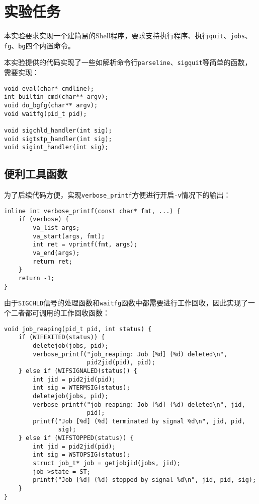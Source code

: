 \documentclass[a4paper, 11pt]{ctexart}
\let\oldsection\section
\renewcommand{\section}{\clearpage\oldsection}
\begin{document}
\section{实验任务}

本实验要求实现一个建简易的Shell程序，要求支持执行程序、执行\texttt{quit}、\texttt{jobs}、\texttt{fg}、\texttt{bg}四个内置命令。

本实验提供的代码实现了一些如解析命令行\texttt{parseline}、\texttt{sigquit}等简单的函数，需要实现：

\begin{verbatim}
void eval(char* cmdline);
int builtin_cmd(char** argv);
void do_bgfg(char** argv);
void waitfg(pid_t pid);

void sigchld_handler(int sig);
void sigtstp_handler(int sig);
void sigint_handler(int sig);
\end{verbatim}

\subsection{便利工具函数}

为了后续代码方便，实现\texttt{verbose\_printf}方便进行开启\texttt{-v}情况下的输出：

\begin{verbatim}
inline int verbose_printf(const char* fmt, ...) {
    if (verbose) {
        va_list args;
        va_start(args, fmt);
        int ret = vprintf(fmt, args);
        va_end(args);
        return ret;
    }
    return -1;
}
\end{verbatim}

由于\texttt{SIGCHLD}信号的处理函数和\texttt{waitfg}函数中都需要进行工作回收，因此实现了一个二者都可调用的工作回收函数：

\begin{verbatim}
void job_reaping(pid_t pid, int status) {
    if (WIFEXITED(status)) {
        deletejob(jobs, pid);
        verbose_printf("job_reaping: Job [%d] (%d) deleted\n",
                       pid2jid(pid), pid);
    } else if (WIFSIGNALED(status)) {
        int jid = pid2jid(pid);
        int sig = WTERMSIG(status);
        deletejob(jobs, pid);
        verbose_printf("job_reaping: Job [%d] (%d) deleted\n", jid,
                       pid);
        printf("Job [%d] (%d) terminated by signal %d\n", jid, pid,
               sig);
    } else if (WIFSTOPPED(status)) {
        int jid = pid2jid(pid);
        int sig = WSTOPSIG(status);
        struct job_t* job = getjobjid(jobs, jid);
        job->state = ST;
        printf("Job [%d] (%d) stopped by signal %d\n", jid, pid, sig);
    }
}
\end{verbatim}
\end{document}
